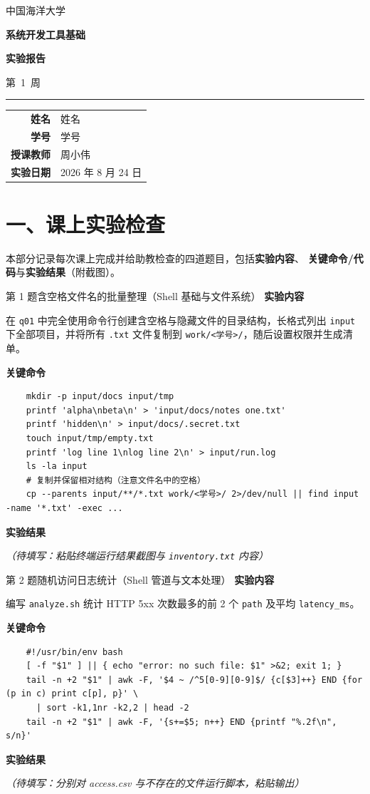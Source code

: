 \documentclass[UTF8, zihao=-4]{ctexart}
\makeatletter
\newcommand{\university}{中国海洋大学}
\newcommand{\coursename}{系统开发工具基础}
\newcommand{\teacher}{周小伟}
\newcommand{\studentname}{姓名}
\newcommand{\studentid}{学号}
\newcommand{\reportweek}{第~1~周}
\newcommand{\reportdate}{2026 年 8 月 24 日}
\newcommand{\makereporttitle}{%
  \begin{center}
    {\small\color{cgray}\university\par}
    \vspace{0.8em}
    {\Huge\bfseries\color{cprimary}\coursename\par}
    \vspace{0.3em}
    {\Large\bfseries 实\quad 验\quad 报\quad 告\par}
    \vspace{0.6em}
    {\large\reportweek\par}
    \vspace{0.8em}
    {\color{cprimary}\rule{0.7\textwidth}{1.2pt}\par}
    \vspace{1.2em}
    \renewcommand{\arraystretch}{1.6}
    \begin{tabular}{>{\bfseries}r@{\hspace{1.5em}}l}
      姓\quad 名 & \studentname \\
      学\quad 号 & \studentid \\
      授课教师 & \teacher \\
      实验日期 & \reportdate \\
    \end{tabular}
  \end{center}
  \vspace{1em}
}
\newcommand{\contenthead}[1]{%
  \medskip\noindent\textcolor{cprimary}{\bfseries #1}\par\smallskip
}
\newcommand{\todo}[1]{\textcolor{caccent}{\emph{（待填写：#1）}}}
\makeatother
\begin{document}
\makereporttitle

\section*{一、课上实验检查}

本部分记录每次课上完成并给助教检查的四道题目，包括\textbf{实验内容}、
\textbf{关键命令/代码}与\textbf{实验结果}（附截图）。

\begin{experiment}{第 1 题}{含空格文件名的批量整理（Shell 基础与文件系统）}
  \contenthead{实验内容}
  在 \texttt{q01} 中完全使用命令行创建含空格与隐藏文件的目录结构，长格式列出
  \texttt{input} 下全部项目，并将所有 \texttt{.txt} 文件复制到
  \texttt{work/<学号>/}，随后设置权限并生成清单。

  \contenthead{关键命令}
  \begin{verbatim}
    mkdir -p input/docs input/tmp
    printf 'alpha\nbeta\n' > 'input/docs/notes one.txt'
    printf 'hidden\n' > input/docs/.secret.txt
    touch input/tmp/empty.txt
    printf 'log line 1\nlog line 2\n' > input/run.log
    ls -la input
    # 复制并保留相对结构（注意文件名中的空格）
    cp --parents input/**/*.txt work/<学号>/ 2>/dev/null || find input -name '*.txt' -exec ...
  \end{verbatim}

  \contenthead{实验结果}
  \todo{粘贴终端运行结果截图与 \texttt{inventory.txt} 内容}
\end{experiment}

\begin{experiment}{第 2 题}{随机访问日志统计（Shell 管道与文本处理）}
  \contenthead{实验内容}
  编写 \texttt{analyze.sh} 统计 HTTP 5xx 次数最多的前 2 个 \texttt{path} 及平均
  \texttt{latency\_ms}。

  \contenthead{关键命令}
  \begin{verbatim}
    #!/usr/bin/env bash
    [ -f "$1" ] || { echo "error: no such file: $1" >&2; exit 1; }
    tail -n +2 "$1" | awk -F, '$4 ~ /^5[0-9][0-9]$/ {c[$3]++} END {for (p in c) print c[p], p}' \
      | sort -k1,1nr -k2,2 | head -2
    tail -n +2 "$1" | awk -F, '{s+=$5; n++} END {printf "%.2f\n", s/n}'
  \end{verbatim}

  \contenthead{实验结果}
  \todo{分别对 access.csv 与不存在的文件运行脚本，粘贴输出}
\end{experiment}
\end{document}
